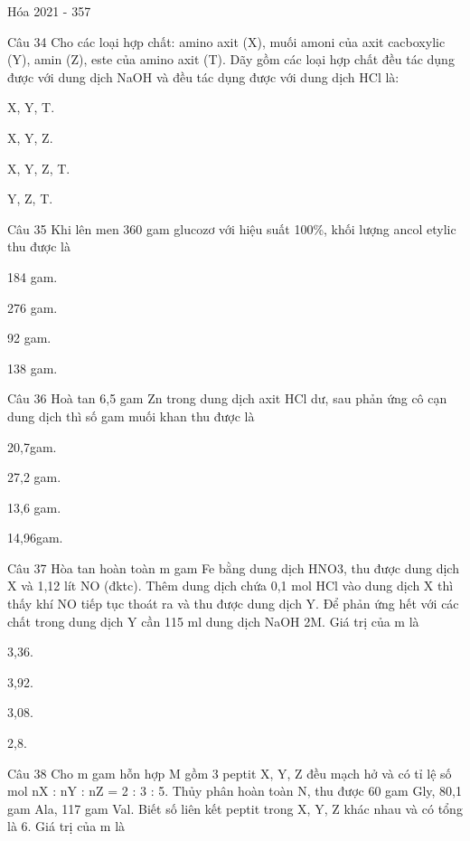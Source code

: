 \documentclass{book}
\begin{document}
\begin{quiz}{Hóa 2021 - 357}
\begin{multi}[points=1]{Câu 34}
 Cho các loại hợp chất: amino axit (X), muối amoni của axit cacboxylic (Y), amin (Z), este của amino axit (T). Dãy gồm các loại hợp chất đều tác dụng được với dung dịch NaOH và đều tác dụng được với dung dịch HCl là: 

\item*  X, Y, T.	
\item  X, Y, Z.	
\item  X, Y, Z, T.	
\item  Y, Z, T.
\end{multi}

\begin{multi}[points=1]{Câu 35}
 Khi lên men 360 gam glucozơ với hiệu suất 100\%, khối lượng ancol etylic thu được là

\item*  184 gam.	
\item  276 gam.	
\item  92 gam.	
\item  138 gam.
\end{multi}

\begin{multi}[points=1]{Câu 36}
 Hoà tan 6,5 gam Zn trong dung dịch axit HCl dư, sau phản ứng cô cạn dung dịch thì số gam muối khan thu được là

\item  20,7gam.	
\item  27,2 gam.	
\item*  13,6 gam.	
\item  14,96gam.
\end{multi}

\begin{multi}[points=1]{Câu 37}
 Hòa tan hoàn toàn m gam Fe bằng dung dịch HNO3, thu được dung dịch X và 1,12 lít NO (đktc). Thêm dung dịch chứa 0,1 mol HCl vào dung dịch X thì thấy khí NO tiếp tục thoát ra và thu được dung dịch Y. Để phản ứng hết với các chất trong dung dịch Y cần 115 ml dung dịch NaOH 2M. Giá trị của m là

\item  3,36.	
\item*  3,92.	
\item  3,08.	
\item  2,8.
\end{multi}

\begin{multi}[points=1]{Câu 38}
 Cho m gam hỗn hợp M gồm 3 peptit X, Y, Z đều mạch hở và có tỉ lệ số mol nX : nY : nZ = 2 : 3 : 5. Thủy phân hoàn toàn N, thu được 60 gam Gly, 80,1 gam Ala, 117 gam Val. Biết số liên kết peptit trong X, Y, Z khác nhau và có tổng là 6. Giá trị của m là


\end{multi}
\end{quiz}
\end{document}
